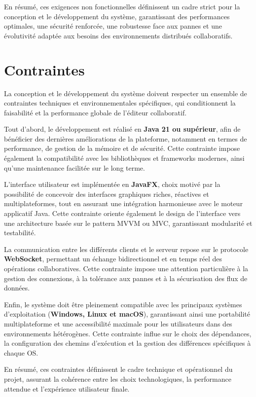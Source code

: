 \documentclass[a4paper,oneside,12pt]{book}
\begin{document}
En résumé, ces exigences non fonctionnelles définissent un cadre strict pour la conception et le développement du système, garantissant des performances optimales, une sécurité renforcée, une robustesse face aux pannes et une évolutivité adaptée aux besoins des environnements distribués collaboratifs.
\section{\textbf{Contraintes}}

La conception et le développement du système doivent respecter un ensemble de contraintes techniques et environnementales spécifiques, qui conditionnent la faisabilité et la performance globale de l’éditeur collaboratif.

Tout d’abord, le développement est réalisé en \textbf{Java 21 ou supérieur}, afin de bénéficier des dernières améliorations de la plateforme, notamment en termes de performance, de gestion de la mémoire et de sécurité. Cette contrainte impose également la compatibilité avec les bibliothèques et frameworks modernes, ainsi qu’une maintenance facilitée sur le long terme.

L’interface utilisateur est implémentée en \textbf{JavaFX}, choix motivé par la possibilité de concevoir des interfaces graphiques riches, réactives et multiplateformes, tout en assurant une intégration harmonieuse avec le moteur applicatif Java. Cette contrainte oriente également le design de l’interface vers une architecture basée sur le pattern MVVM ou MVC, garantissant modularité et testabilité.

La communication entre les différents clients et le serveur repose sur le protocole \textbf{WebSocket}, permettant un échange bidirectionnel et en temps réel des opérations collaboratives. Cette contrainte impose une attention particulière à la gestion des connexions, à la tolérance aux pannes et à la sécurisation des flux de données.

Enfin, le système doit être pleinement compatible avec les principaux systèmes d’exploitation (\textbf{Windows, Linux et macOS}), garantissant ainsi une portabilité multiplateforme et une accessibilité maximale pour les utilisateurs dans des environnements hétérogènes. Cette contrainte influe sur le choix des dépendances, la configuration des chemins d’exécution et la gestion des différences spécifiques à chaque OS.

En résumé, ces contraintes définissent le cadre technique et opérationnel du projet, assurant la cohérence entre les choix technologiques, la performance attendue et l’expérience utilisateur finale.
\end{document}
